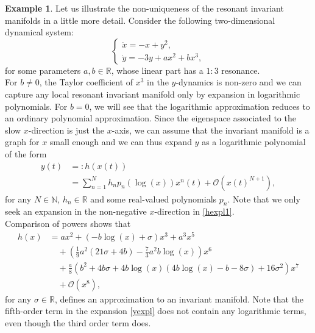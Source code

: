 \documentclass{amsart}
\theoremstyle{plain}
\theoremstyle{definition}
\newtheorem{example}[theorem]{Example}
\begin{document}
\begin{example}
Let us illustrate the non-uniqueness of the resonant invariant manifolds in a little more detail. Consider the following two-dimensional dynamical system:
\begin{equation}\label{systexpl1}
\begin{cases}
\dot{x}=-x+y^2,\\
\dot{y}=-3y + a x^2+ b x^3,
\end{cases}
\end{equation}
for some parameters $a,b \in\mathbb{R}$, whose linear part has a $1:3$ resonance.\\
For $b\neq 0$, the Taylor coefficient of $x^3$ in the $y$-dynamics is non-zero and we can capture any local resonant invariant manifold only by expansion in logarithmic polynomials. For $b=0$, we will see that the logarithmic approximation reduces to an ordinary polynomial approximation. Since the eigenspace associated to the slow $x$-direction is just the $x$-axis, we can assume that the invariant manifold is a graph for $x$ small enough and we can thus expand $y$ as a logarithmic polynomial of the form
\begin{equation}\label{hexpl1}
\begin{split}
y(t)&=:h(x(t))\\
&=\sum_{n=1}^N h_n p_n(\log(x)) x^n(t)+\mathcal{O}(x(t)^{N+1}),
\end{split}
\end{equation}
for any $N\in \mathbb{N}$, $h_n\in \mathbb{R}$ and some real-valued polynomials $p_n$. Note that we only seek an expansion in the non-negative $x$-direction in \eqref{hexpl1}.\\
 Comparison of powers shows that
\begin{equation}\label{yexpl}
\begin{split}
h(x)&=a x^2  +  (-b \log(x) + \sigma)x^3  + a^3 x^5\\
&\quad+ \left(\frac{1}{9} a^2 (21 \sigma+4 b)-\frac{7}{3} a^2 b \log (x)\right) x^6\\
&\quad +\frac{a}{8}  \left(b^2+4 b \sigma +4 b \log (x) (4 b \log (x)-b-8 \sigma )+16
\sigma ^2\right)x^7\\
&\quad +\mathcal{O}(x^8),
\end{split}
\end{equation}
for any $\sigma\in\mathbb{R}$, defines an approximation to an invariant manifold. Note that the fifth-order term in the expansion \eqref{yexpl} does not contain any logarithmic terms, even though the third order term does. 

\end{example}
\end{document}
